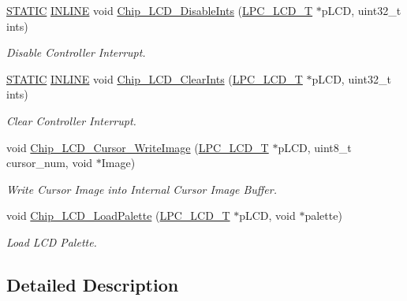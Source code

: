 \begin{DoxyCompactItemize}
\hyperlink{group___l_p_c___types___public___macros_ga10b2d890d871e1489bb02b7e70d9bdfb}{S\+T\+A\+T\+IC} \hyperlink{spifi__18xx__43xx_8h_a2eb6f9e0395b47b8d5e3eeae4fe0c116}{I\+N\+L\+I\+NE} void \hyperlink{group___l_c_d__18_x_x__43_x_x_ga98d2df2f7630bce1ca9e6af19f8c8426}{Chip\+\_\+\+L\+C\+D\+\_\+\+Disable\+Ints} (\hyperlink{struct_l_p_c___l_c_d___t}{L\+P\+C\+\_\+\+L\+C\+D\+\_\+T} $\ast$p\+L\+CD, uint32\+\_\+t ints)
\begin{DoxyCompactList}\small\item\em Disable Controller Interrupt. \end{DoxyCompactList}\item 
\hyperlink{group___l_p_c___types___public___macros_ga10b2d890d871e1489bb02b7e70d9bdfb}{S\+T\+A\+T\+IC} \hyperlink{spifi__18xx__43xx_8h_a2eb6f9e0395b47b8d5e3eeae4fe0c116}{I\+N\+L\+I\+NE} void \hyperlink{group___l_c_d__18_x_x__43_x_x_ga895dd5e12a15f0a30ab17054747ce9f7}{Chip\+\_\+\+L\+C\+D\+\_\+\+Clear\+Ints} (\hyperlink{struct_l_p_c___l_c_d___t}{L\+P\+C\+\_\+\+L\+C\+D\+\_\+T} $\ast$p\+L\+CD, uint32\+\_\+t ints)
\begin{DoxyCompactList}\small\item\em Clear Controller Interrupt. \end{DoxyCompactList}\item 
void \hyperlink{group___l_c_d__18_x_x__43_x_x_ga51c750babdecc5a01beff92f32b431af}{Chip\+\_\+\+L\+C\+D\+\_\+\+Cursor\+\_\+\+Write\+Image} (\hyperlink{struct_l_p_c___l_c_d___t}{L\+P\+C\+\_\+\+L\+C\+D\+\_\+T} $\ast$p\+L\+CD, uint8\+\_\+t cursor\+\_\+num, void $\ast$Image)
\begin{DoxyCompactList}\small\item\em Write Cursor Image into Internal Cursor Image Buffer. \end{DoxyCompactList}\item 
void \hyperlink{group___l_c_d__18_x_x__43_x_x_gaca363a0ae6e47d7bba4d0c51b99b0c8a}{Chip\+\_\+\+L\+C\+D\+\_\+\+Load\+Palette} (\hyperlink{struct_l_p_c___l_c_d___t}{L\+P\+C\+\_\+\+L\+C\+D\+\_\+T} $\ast$p\+L\+CD, void $\ast$palette)
\begin{DoxyCompactList}\small\item\em Load L\+CD Palette. \end{DoxyCompactList}\end{DoxyCompactItemize}


\subsection{Detailed Description}


